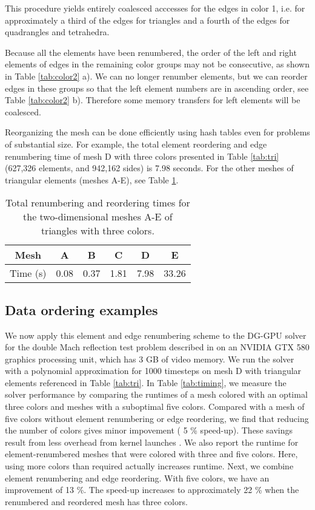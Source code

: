 \documentclass[12pt]{article}
\begin{document}
	This procedure yields entirely coalesced acccesses for the edges in color 1, i.e. for approximately a third of the edges for triangles and a fourth of the edges for quadrangles and tetrahedra. 
	
	Because all the elements have been renumbered, the order of the left and right elements of edges in the remaining color groups may not be consecutive, as shown in Table \ref{tab:color2} a).  We can no longer renumber elements, but we can reorder edges in these groups so that the left element numbers are in ascending order, see Table \ref{tab:color2} b).  Therefore some memory transfers for left elements will be coalesced.  
	
	Reorganizing the mesh can be done efficiently using hash tables even for problems of substantial size.  For example, the total element reordering and edge renumbering time of mesh D with three colors presented in Table \ref{tab:tri} (627,326 elements, and 942,162 sides) is 7.98 seconds.  For the other meshes of triangular elements (meshes A-E), see Table \ref{tab:renum}.
	
	\begin{table}
	\centering

	\begin{tabular}{|c|c|c|c|c|c|}
			\hline Mesh & A & B & C & D & E \\ 
			\hline Time (s) & 0.08 & 0.37 & 1.81 & 7.98 & 33.26 \\ 
			\hline
	\end{tabular} 
	\caption{Total renumbering and reordering times for the two-dimensional meshes A-E of triangles with three colors.} \label{tab:renum}
	\end{table}
	
	
	\subsection{Data ordering examples}
	We now apply this element and edge renumbering scheme to the DG-GPU solver for the double Mach reflection test problem described in \cite{giuliani} on an NVIDIA GTX 580 graphics processing unit, which has 3 GB of video memory.  We run the solver with a polynomial approximation  for 1000 timesteps on mesh D with triangular elements referenced in Table \ref{tab:tri}.  In Table \ref{tab:timing}, we measure the solver performance by comparing the runtimes of a mesh colored with an optimal three colors and meshes with a suboptimal five colors.  Compared with a mesh of five colors without element renumbering or edge reordering, we find that reducing the number of colors gives minor impovement ( 5 \% speed-up).  These savings result from less overhead from kernel launches \cite{luo}.  We also report the runtime for element-renumbered meshes that were colored with three and five colors.  Here, using more colors than required actually increases runtime.  Next, we combine element renumbering and edge reordering. With five colors, we have an improvement of  13 \%.  The speed-up increases to approximately 22 \% when the renumbered and reordered mesh has three colors.
	
\end{document}
